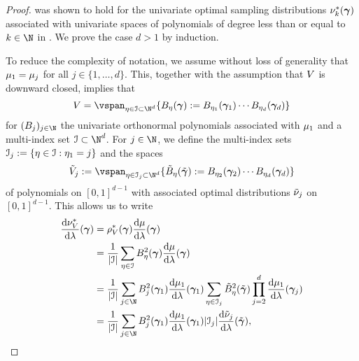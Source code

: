 \begin{proof}
	  was shown to hold for the univariate optimal sampling distributions $\nu^{*}_{k}(\bm{\gamma})$ associated with univariate spaces of polynomials of degree less than or equal to $k\in\N$ in \cite[Equation 7.14]{mastroianni2000weighted}.%
	We prove the case $d>1$ by induction.

	To reduce the complexity of notation, we assume without loss of generality that $\mu_1=\mu_j$ for all $j\in\{1,\dots,d\}$. This, together with the assumption that $V$ is downward closed, implies that
	\begin{equation*}
	\vsp=\vspan_{\mip\in \mis\subset \N^d}\{\onb_{\mip}(\psmi):=\onb_{\mip_1}(\psmi_1)\cdots \onb_{\mip_{d}}(\psmi_d)\}
	\end{equation*} for $(\onb_{j})_{j\in\N}$ the univariate orthonormal polynomials associated with $\mu_{1}$ and a multi-index set $\mis\subset\N^d$. For $j\in\N$, we define the multi-index sets $\mathcal{I}_{j}:=\{\eta\in\mathcal{I}: \eta_{1}=j\}$ and the spaces
	\begin{equation*}
	\tilde{\vsp}_{j}:=\vspan_{\mip\in \mis_{j}\subset \N^d}\{\tilde{\onb}_{\mip}(\tilde{\psmi}):=\onb_{\mip_2}(\psmi_2)\cdots \onb_{\mip_{d}}(\psmi_{d})\}
	\end{equation*} of polynomials on $[0,1]^{d-1}$ with associated optimal distributions $\tilde{\nu}_{j}$ on $[0,1]^{d-1}$. This allows us to write
	\begin{equation*}
	\begin{split}
	\frac{\text{d}\optimaldistribution_{\vsp}}{\text{d}\lambda}(\psmi)&=\optimaldensity_{\vsp}(\psmi)\frac{\text{d}\measure}{\text{d}\lambda}(\psmi)\\
	&=\frac{1}{|\mis|}\sum_{\mip\in\mis}\onb_{\mip}^2(\psmi)\frac{\text{d}\measure}{\text{d}\lambda}(\psmi)\\
	&=\frac{1}{|\mis|}\sum_{j\in\N}\onb_{j}^2(\psmi_1)\frac{\text{d}\measure_{1}}{\text{d}\lambda}(\psmi_1)\sum_{\mip\in\mis_{j}}\tilde{\onb}_{\mip}^2(\tilde{\psmi})\prod_{j=2}^{d}\frac{\mathup{d}\measure_{1}}{\mathup{d}\lambda}(\psmi_j)\\
	&=\frac{1}{|\mis|}\sum_{j\in\N}\onb_{j}^2(\psmi_1)\frac{\text{d}\measure_{1}}{\text{d}\lambda}(\psmi_{1})|\mis_{j}|\frac{\text{d}\tilde{\samplingmeasure}_{j}}{\text{d}\lambda}(\tilde{\psmi}),
	\end{split}

\end{equation*}
\end{proof}

